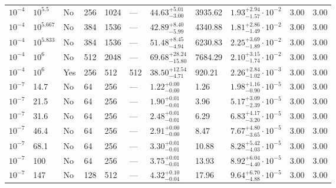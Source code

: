 \documentclass[aps, prfluids, onecolumn, notitlepage, nofootinbib, groupedaddress, amsfonts, amssymb, amsmath]{revtex4-1}
\begin{document}
\begin{center}
\begin{longtable}{ p{1cm} p{1cm} p{1cm} p{1cm} p{1cm} p{1cm} p{1.75cm} p{1.5cm} p{2.75cm} p{1cm} p{1.2cm}  }
\vspace{0.08cm}$10^{-4}$	&	$10^{5.5}$	&	No	&	256	&	1024	&	---	&$	44.63	_{-	3.00	}^{+	5.01	}$&	3935.62	&$	1.93	_{-	1.57	}^{+	2.94}\cdot 10^{-2}	$&	3.00	&	3.00	\\
\vspace{0.08cm}$10^{-4}$	&	$10^{5.667}$	&	No	&	384	&	1536	&	---	&$	42.89	_{-	5.99	}^{+	8.40	}$&	4340.88	&$	1.81	_{-	1.49	}^{+	2.86}\cdot 10^{-2}	$&	3.00	&	3.00	\\
\vspace{0.08cm}$10^{-4}$	&	$10^{5.833}$	&	No	&	384	&	1536	&	---	&$	51.48	_{-	4.94	}^{+	8.45	}$&	6230.83	&$	2.25	_{-	1.89	}^{+	3.69}\cdot 10^{-2}	$&	3.00	&	3.00	\\
\vspace{0.08cm}$10^{-4}$	&	$10^6$	&	No	&	512	&	2048	&	---	&$	69.68	_{-	15.80	}^{+	28.24	}$&	7684.29	&$	2.10	_{-	1.74	}^{+	3.15}\cdot 10^{-2}	$&	3.00	&	3.00	\\
\vspace{0.08cm}$10^{-4}$	&	$10^6$	&	Yes	&	256	&	512	&	512	&$	38.50	_{-	4.71	}^{+	12.54	}$&	920.21	&$	2.26	_{-	1.02	}^{+	2.84}\cdot 10^{-3}	$&	3.00	&	3.00	\\
\vspace{0.08cm}$10^{-7}$	&	14.7	&	No	&	64	&	256	&	---	&$	1.22	_{-	0.00	}^{+	0.00	}$&	1.26	&$	1.98	_{-	0.90	}^{+	1.16}\cdot 10^{-5}	$&	3.00	&	3.00	\\
\vspace{0.08cm}$10^{-7}$	&	21.5	&	No	&	64	&	256	&	---	&$	1.90	_{-	0.01	}^{+	0.01	}$&	3.96	&$	5.17	_{-	2.39	}^{+	3.09}\cdot 10^{-5}	$&	3.00	&	3.00	\\
\vspace{0.08cm}$10^{-7}$	&	31.6	&	No	&	64	&	256	&	---	&$	2.48	_{-	0.01	}^{+	0.01	}$&	6.29	&$	6.83	_{-	3.20	}^{+	4.17}\cdot 10^{-5}	$&	3.00	&	3.00	\\
\vspace{0.08cm}$10^{-7}$	&	46.4	&	No	&	64	&	256	&	---	&$	2.91	_{-	0.00	}^{+	0.00	}$&	8.47	&$	7.67	_{-	3.65	}^{+	4.80}\cdot 10^{-5}	$&	3.00	&	3.00	\\
\vspace{0.08cm}$10^{-7}$	&	68.1	&	No	&	64	&	256	&	---	&$	3.30	_{-	0.01	}^{+	0.01	}$&	10.88	&$	8.28	_{-	4.03	}^{+	5.42}\cdot 10^{-5}	$&	3.00	&	3.00	\\
\vspace{0.08cm}$10^{-7}$	&	100	&	No	&	64	&	256	&	---	&$	3.75	_{-	0.01	}^{+	0.01	}$&	13.93	&$	8.92	_{-	4.40	}^{+	6.04}\cdot 10^{-5}	$&	3.00	&	3.00	\\
\vspace{0.08cm}$10^{-7}$	&	147	&	No	&	128	&	512	&	---	&$	4.32	_{-	0.04	}^{+	0.10	}$&	17.96	&$	9.64	_{-	4.88	}^{+	6.70}\cdot 10^{-5}	$&	3.00	&	3.00	\\

\end{longtable}
\end{center}
\end{document}
